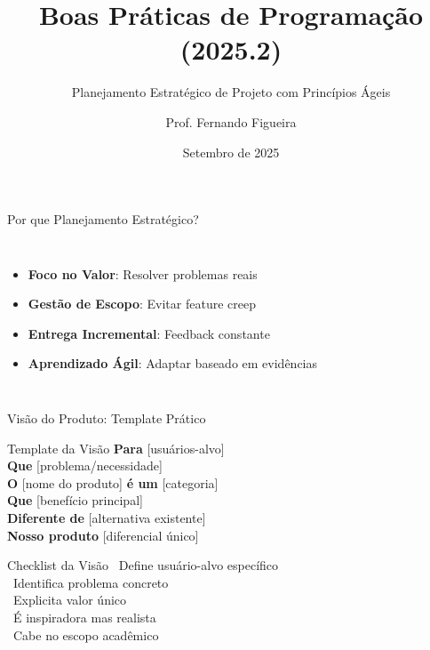 \documentclass[10pt]{beamer}
\title{Boas Práticas de Programação (2025.2)}
\subtitle{Planejamento Estratégico de Projeto com Princípios Ágeis}
\author{Prof. Fernando Figueira}
\institute{DIMAp - UFRN}
\date{Setembro de 2025}
\begin{document}
\frame{\titlepage}

\begin{frame}{Por que Planejamento Estratégico?}
\begin{columns}[c]
\begin{itemize}
    \item \textbf{Foco no Valor}: Resolver problemas reais
    \item \textbf{Gestão de Escopo}: Evitar feature creep
    \item \textbf{Entrega Incremental}: Feedback constante
    \item \textbf{Aprendizado Ágil}: Adaptar baseado em evidências
\end{itemize}

\centering
{}
\end{columns}
\end{frame}

\begin{frame}{Visão do Produto: Template Prático}
\begin{block}{Template da Visão}
\textbf{Para} [usuários-alvo] \\
\textbf{Que} [problema/necessidade] \\
\textbf{O} [nome do produto] \textbf{é um} [categoria] \\
\textbf{Que} [benefício principal] \\
\textbf{Diferente de} [alternativa existente] \\
\textbf{Nosso produto} [diferencial único]
\end{block}

\vspace{0.3cm}
\begin{exampleblock}{Checklist da Visão}
\small
\checkmark\ Define usuário-alvo específico \\
\checkmark\ Identifica problema concreto \\
\checkmark\ Explicita valor único \\
\checkmark\ É inspiradora mas realista \\
\checkmark\ Cabe no escopo acadêmico
\end{exampleblock}
\end{frame}
\end{document}
